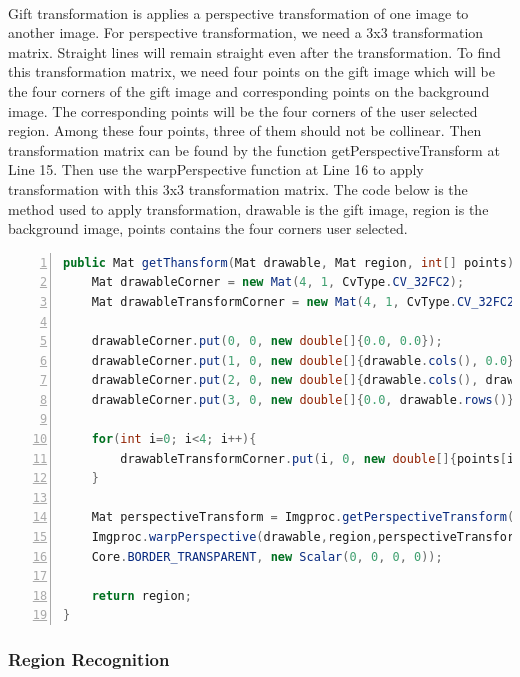 \paragraph{} Gift transformation is applies a perspective transformation of one image to another image. For perspective transformation, we need a 3x3 transformation matrix. Straight lines will remain straight even after the transformation. To find this transformation matrix, we need four points on the gift image which will be the four corners of the gift image and corresponding points on the background image. The corresponding points will be the four corners of the user selected region.  Among these four points, three of them should not be collinear. Then transformation matrix can be found by the function getPerspectiveTransform at Line 15. Then use the warpPerspective function at Line 16  to apply transformation with this 3x3 transformation matrix. The code below is the method used to apply transformation, drawable is the gift image, region is the background image, points contains the four corners user selected.
\begin{lstlisting}[language={java},
        numbers=left,basicstyle=\small\ttfamily,breaklines=true]
public Mat getThansform(Mat drawable, Mat region, int[] points) {
    Mat drawableCorner = new Mat(4, 1, CvType.CV_32FC2);
    Mat drawableTransformCorner = new Mat(4, 1, CvType.CV_32FC2);

    drawableCorner.put(0, 0, new double[]{0.0, 0.0});
    drawableCorner.put(1, 0, new double[]{drawable.cols(), 0.0});
    drawableCorner.put(2, 0, new double[]{drawable.cols(), drawable.rows()});
    drawableCorner.put(3, 0, new double[]{0.0, drawable.rows()});
    
    for(int i=0; i<4; i++){
        drawableTransformCorner.put(i, 0, new double[]{points[i*2], points[i*2+1]});
    }

    Mat perspectiveTransform = Imgproc.getPerspectiveTransform(drawableCorner, drawableTransformCorner);
    Imgproc.warpPerspective(drawable,region,perspectiveTransform, region.size(), Imgproc.INTER_LINEAR,
    Core.BORDER_TRANSPARENT, new Scalar(0, 0, 0, 0));

    return region;
}
\end{lstlisting} 
\subsubsection{Region Recognition}
